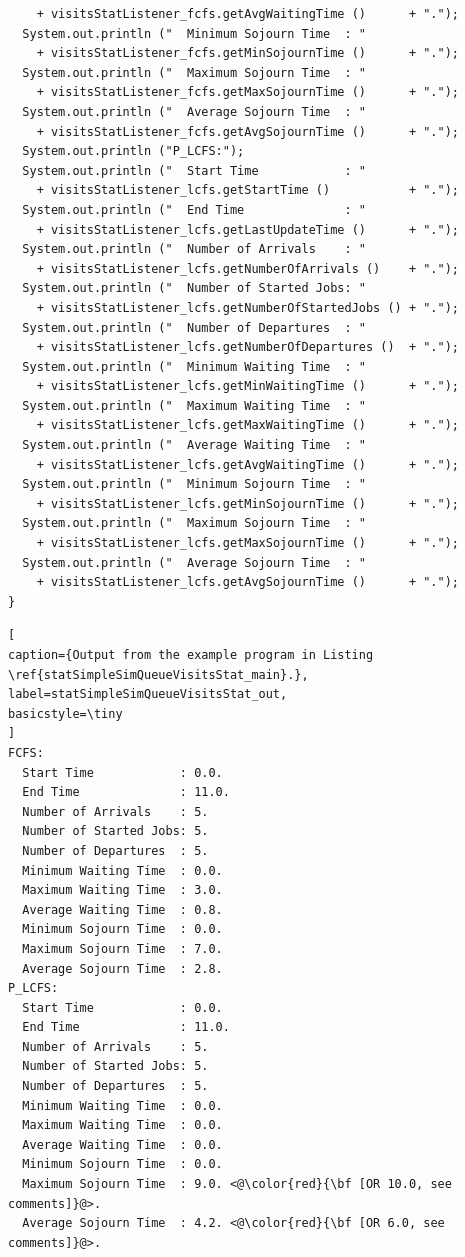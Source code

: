 \documentclass[12pt]{book}
\begin{document}
\begin{lstlisting}
    + visitsStatListener_fcfs.getAvgWaitingTime ()      + ".");
  System.out.println ("  Minimum Sojourn Time  : "
    + visitsStatListener_fcfs.getMinSojournTime ()      + ".");
  System.out.println ("  Maximum Sojourn Time  : "
    + visitsStatListener_fcfs.getMaxSojournTime ()      + ".");
  System.out.println ("  Average Sojourn Time  : "
    + visitsStatListener_fcfs.getAvgSojournTime ()      + ".");
  System.out.println ("P_LCFS:");
  System.out.println ("  Start Time            : "
    + visitsStatListener_lcfs.getStartTime ()           + ".");
  System.out.println ("  End Time              : "
    + visitsStatListener_lcfs.getLastUpdateTime ()      + ".");
  System.out.println ("  Number of Arrivals    : "
    + visitsStatListener_lcfs.getNumberOfArrivals ()    + ".");
  System.out.println ("  Number of Started Jobs: "
    + visitsStatListener_lcfs.getNumberOfStartedJobs () + ".");
  System.out.println ("  Number of Departures  : "
    + visitsStatListener_lcfs.getNumberOfDepartures ()  + ".");
  System.out.println ("  Minimum Waiting Time  : "
    + visitsStatListener_lcfs.getMinWaitingTime ()      + ".");
  System.out.println ("  Maximum Waiting Time  : "
    + visitsStatListener_lcfs.getMaxWaitingTime ()      + ".");
  System.out.println ("  Average Waiting Time  : "
    + visitsStatListener_lcfs.getAvgWaitingTime ()      + ".");
  System.out.println ("  Minimum Sojourn Time  : "
    + visitsStatListener_lcfs.getMinSojournTime ()      + ".");
  System.out.println ("  Maximum Sojourn Time  : "
    + visitsStatListener_lcfs.getMaxSojournTime ()      + ".");
  System.out.println ("  Average Sojourn Time  : "
    + visitsStatListener_lcfs.getAvgSojournTime ()      + ".");
}
\end{lstlisting}

\begin{lstlisting}[
caption={Output from the example program in Listing \ref{statSimpleSimQueueVisitsStat_main}.},
label=statSimpleSimQueueVisitsStat_out,
basicstyle=\tiny
]
FCFS:
  Start Time            : 0.0.
  End Time              : 11.0.
  Number of Arrivals    : 5.
  Number of Started Jobs: 5.
  Number of Departures  : 5.
  Minimum Waiting Time  : 0.0.
  Maximum Waiting Time  : 3.0.
  Average Waiting Time  : 0.8.
  Minimum Sojourn Time  : 0.0.
  Maximum Sojourn Time  : 7.0.
  Average Sojourn Time  : 2.8.
P_LCFS:
  Start Time            : 0.0.
  End Time              : 11.0.
  Number of Arrivals    : 5.
  Number of Started Jobs: 5.
  Number of Departures  : 5.
  Minimum Waiting Time  : 0.0.
  Maximum Waiting Time  : 0.0.
  Average Waiting Time  : 0.0.
  Minimum Sojourn Time  : 0.0.
  Maximum Sojourn Time  : 9.0. <@\color{red}{\bf [OR 10.0, see comments]}@>.
  Average Sojourn Time  : 4.2. <@\color{red}{\bf [OR 6.0, see comments]}@>.
\end{lstlisting}
\end{document}
